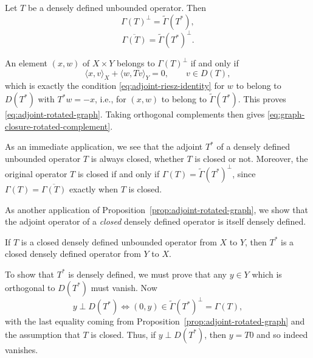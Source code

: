\begin{Proposition}\label{prop:adjoint-rotated-graph}
{Let $T$ be a densely defined unbounded operator. Then}
\begin{equation}\label{eq:adjoint-rotated-graph}
\Gamma(T)^\perp=\widetilde\Gamma(T^*),
\end{equation}
\begin{equation}\label{eq:graph-closure-rotated-complement}
\overline{\Gamma(T)}=\widetilde\Gamma(T^*)^\perp.
\end{equation}
\end{Proposition}

\begin{Proof}
{An element $(x,w)$ of $X\times Y$ belongs to $\Gamma(T)^\perp$ if and only if}
\[
\langle x,v\rangle_X+\langle w,Tv\rangle_Y=0,\qquad v\in D(T),
\]
{which is exactly the condition \eqref{eq:adjoint-riesz-identity} for $w$ to belong to $D(T^*)$ with $T^*w=-x$, i.e., for $(x,w)$ to belong to $\widetilde\Gamma(T^*)$. This proves \eqref{eq:adjoint-rotated-graph}. Taking orthogonal complements then gives \eqref{eq:graph-closure-rotated-complement}.}
\end{Proof}

{As an immediate application, we see that the adjoint $T^*$ of a densely defined unbounded operator $T$ is always closed, whether $T$ is closed or not. Moreover, the original operator $T$ is closed if and only if $\Gamma(T)=\widetilde\Gamma(T^*)^\perp$, since $\Gamma(T)=\overline{\Gamma(T)}$ exactly when $T$ is closed.}

{As another application of Proposition~\ref{prop:adjoint-rotated-graph}, we show that the adjoint operator of a \emph{closed} densely defined operator is itself densely defined.}

\begin{Proposition}\label{prop:closed-adjoint-densely-defined}
{If $T$ is a closed densely defined unbounded operator from $X$ to $Y$, then $T^*$ is a closed densely defined operator from $Y$ to $X$.}
\end{Proposition}

\begin{Proof}
{To show that $T^*$ is densely defined, we must prove that any $y\in Y$ which is orthogonal to $D(T^*)$ must vanish. Now}
\[
y\perp D(T^*)\iff(0,y)\in\widetilde\Gamma(T^*)^\perp=\Gamma(T),
\]
{with the last equality coming from Proposition~\ref{prop:adjoint-rotated-graph} and the assumption that $T$ is closed. Thus, if $y\perp D(T^*)$, then $y=T0$ and so indeed vanishes.}
\end{Proof}

